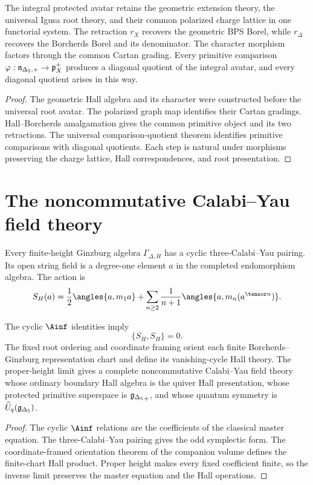 \begin{theorem}
The integral protected avatar retains the geometric extension theory, the universal Igusa root theory, and their common polarized charge lattice in one functorial system.  The retraction $r_X$ recovers the geometric BPS Borel, while $r_\Delta$ recovers the Borcherds Borel and its denominator.  The character morphism factors through the common Cartan grading.  Every primitive comparison $\varphi:{\mathfrak n_{\Delta_5,+}}\to\mathfrak p_X^+$ produces a diagonal quotient of the integral avatar, and every diagonal quotient arises in this way.
\end{theorem}
\begin{proof}
The geometric Hall algebra and its character were constructed before the universal root avatar.  The polarized graph map identifies their Cartan gradings.  Hall--Borcherds amalgamation gives the common primitive object and its two retractions.  The universal comparison-quotient theorem identifies primitive comparisons with diagonal quotients.  Each step is natural under morphisms preserving the charge lattice, Hall correspondences, and root presentation.
\end{proof}

\chapter{The noncommutative Calabi--Yau field theory}
Every finite-height Ginzburg algebra $\Gamma_{\Delta,H}$ has a cyclic three-Calabi--Yau pairing.  Its open string field is a degree-one element $a$ in the completed endomorphism algebra.  The action is
\[
 S_H(a)=
 \frac12\angles{a,m_1a}
 +\sum_{n\ge2}\frac1{n+1}\angles{a,m_n(a^{\tensor n})}.
\]

\begin{theorem}
The cyclic $\Ainf$ identities imply
\[
 \{S_H,S_H\}=0.
\]
The fixed root ordering and coordinate framing orient each finite Borcherds--Ginzburg representation chart and define its vanishing-cycle Hall theory.  The proper-height limit gives a complete noncommutative Calabi--Yau field theory whose ordinary boundary Hall algebra is the quiver Hall presentation, whose protected primitive superspace is ${\mathfrak g_{\Delta_5}}_+$, and whose quantum symmetry is $\widehat U_q({\mathfrak g_{\Delta_5}})$.
\end{theorem}
\begin{proof}
The cyclic $\Ainf$ relations are the coefficients of the classical master equation.  The three-Calabi--Yau pairing gives the odd symplectic form.  The coordinate-framed orientation theorem of the companion volume defines the finite-chart Hall product.  Proper height makes every fixed coefficient finite, so the inverse limit preserves the master equation and the Hall operations.
\end{proof}

